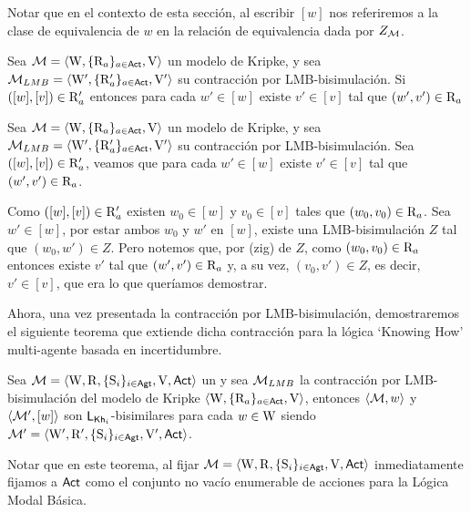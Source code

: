 Notar que en el contexto de esta sección, al escribir $[w]$ nos referiremos a la clase de equivalencia de $w$ en la relación de 
equivalencia dada por $Z_{\mathcal{M}}$.

\begin{lema}\label{lema:LMB-R-lema}
    Sea $\mathcal{M} = \langle \mathrm{W},\{\mathrm{R}_a\}_{a\in{\rm \sf Act}},\mathrm{V} \rangle$ un modelo de Kripke, y sea $\mathcal{M}_{LMB} = \langle \mathrm{W}',\{\mathrm{R}_a'\}_{a\in{\rm \sf Act}},\mathrm{V}' \rangle$ su contracción por LMB-bisimulación.
    Si $([w],[v]) \in \mathrm{R}'_a$ entonces para cada $w' \in [w]$ existe $v' \in [v]$ tal que $(w',v') \in \mathrm{R}_a$
\end{lema}

\begin{demostracion}
    Sea $\mathcal{M} = \langle \mathrm{W},\{\mathrm{R}_a\}_{a\in{\rm \sf Act}},\mathrm{V} \rangle$ un modelo de Kripke, y sea $\mathcal{M}_{LMB} = \langle \mathrm{W}',\{\mathrm{R}_a'\}_{a\in{\rm \sf Act}},\mathrm{V}' \rangle$ su contracción por LMB-bisimulación. Sea $([w],[v]) \in \mathrm{R}'_a$, veamos que para cada $w' \in [w]$ existe $v' \in [v]$ tal que $(w',v') \in \mathrm{R}_a$.

    Como $([w],[v]) \in \mathrm{R}'_a$ existen $w_0 \in [w]$ y $v_0 \in [v]$ tales que $(w_0,v_0)\in \mathrm{R}_a$. Sea $w' \in [w]$, por estar ambos 
    $w_0$ y $w'$ en $[w]$, existe una LMB-bisimulación $Z$ tal que $(w_0,w') \in Z$. Pero notemos que, por (zig) de $Z$, como 
    $(w_0,v_0) \in \mathrm{R}_a$  entonces existe $v'$ tal que $(w',v') \in \mathrm{R}_a$ y, a su vez, 
    $(v_0,v') \in Z$, es decir, $v' \in [v]$, que era lo que queríamos demostrar.
\end{demostracion}

Ahora, una vez presentada la contracción por LMB-bisimulación, demostraremos el siguiente teorema que extiende dicha contracción para 
la lógica `Knowing How' multi-agente basada en incertidumbre.

\begin{teorema}
    Sea $\mathcal{M}=\langle \mathrm{W},\mathrm{R},\{ \mathrm{S}_i \}_{i \in {\rm \sf Agt}},\mathrm{V},{\rm \sf Act} \rangle$ un \ults y sea $\mathcal{M}_{LMB}$ 
    la contracción por LMB-bisimulación del modelo de Kripke $\langle \mathrm{W},\{\mathrm{R}_a\}_{a\in{\rm \sf Act}},\mathrm{V} \rangle$, 
    entonces $\langle \mathcal{M},w \rangle$ y $\langle \mathcal{M}',[w] \rangle$ son $\mathsf{L}_{\mathsf{Kh}_i}$-bisimilares para cada $w \in \mathrm{W}$ 
    siendo $\mathcal{M}' = \langle \mathrm{W}',\mathrm{R}',\{ \mathrm{S}_i \}_{i \in {\rm \sf Agt}},\mathrm{V}',{\rm \sf Act} \rangle$.
\end{teorema}

Notar que en este teorema, al fijar $\mathcal{M}=\langle \mathrm{W},\mathrm{R},\{ \mathrm{S}_i \}_{i \in {\rm \sf Agt}},\mathrm{V},{\rm \sf Act} \rangle$ inmediatamente fijamos a ${\rm \sf Act}$ como el conjunto no vacío enumerable de acciones para la Lógica Modal Básica.

